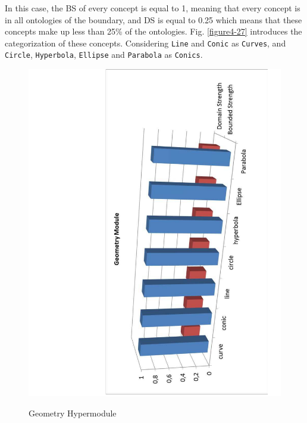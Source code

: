 In this case, the BS of every concept is equal to 1, meaning that every concept is in all ontologies of the boundary, and  DS is equal to 0.25 which means that these concepts make up less than 25\% of the ontologies. Fig. \ref{figure4-27} introduces the categorization of these concepts. Considering \texttt{Line} and \texttt{Conic} as \texttt{Curves}, and \texttt{Circle}, \texttt{Hyperbola}, \texttt{Ellipse} and \texttt{Parabola} as \texttt{Conics}. 



\begin{figure}
\begin{center}
	\includegraphics[scale=0.5, angle=-90]{figure-chapterIV/fig4-26}\\
	\caption{Geometry Hypermodule}
	\label{figure4-26}
\end{center}
\end{figure}





